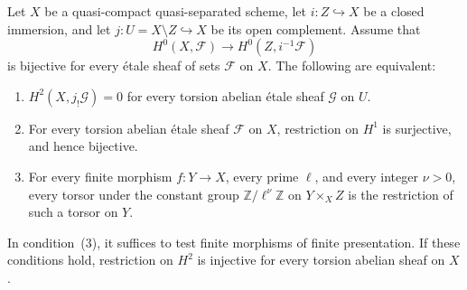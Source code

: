 \begin{proposition}\label{C:torsion-degree-two-reduction}
Let $X$ be a quasi-compact quasi-separated scheme, let
$i:Z\hookrightarrow X$ be a closed immersion, and let
$j:U=X\setminus Z\hookrightarrow X$ be its open complement.
Assume that
\[
 H^0(X,\mathcal F)\longrightarrow H^0(Z,i^{-1}\mathcal F)
\]
is bijective for every \'etale sheaf of sets $\mathcal F$ on $X$.
The following are equivalent:
\begin{enumerate}
\item $H^2(X,j_!\mathcal G)=0$ for every torsion abelian \'etale
sheaf $\mathcal G$ on $U$.
\item For every torsion abelian \'etale sheaf $\mathcal F$ on $X$,
restriction on $H^1$ is surjective, and hence bijective.
\item For every finite morphism $f:Y\to X$, every prime $\ell$, and
every integer $\nu>0$, every torsor under the constant group
$\mathbb Z/\ell^\nu\mathbb Z$ on $Y\times_XZ$ is the restriction of
such a torsor on $Y$.
\end{enumerate}
In condition~(3), it suffices to test finite morphisms of finite
presentation. If these conditions hold, restriction on $H^2$ is
injective for every torsion abelian sheaf on $X$.
\end{proposition}
